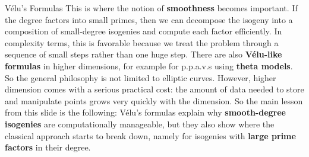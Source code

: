 \documentclass[aspectratio=169,notheorems]{beamer}
\begin{document}
\begin{frame}{Vélu's Formulas}
{			This is where the notion of \textbf{smoothness} becomes important. If the degree factors into small primes, then we can decompose the isogeny into a composition of small-degree isogenies and compute each factor efficiently. In complexity terms, this is favorable because we treat the problem through a sequence of small steps rather than one huge step.
			There are also \textbf{Vélu-like formulas} in higher dimensions, for example for p.p.a.v.s using \textbf{theta models}. So the general philosophy is not limited to elliptic curves. However, higher dimension comes with a serious practical cost: the amount of data needed to store and manipulate points grows very quickly with the dimension.
			So the main lesson from this slide is the following: Vélu's formulas explain why \textbf{smooth-degree isogenies} are computationally manageable, but they also show where the classical approach starts to break down, namely for isogenies with \textbf{large prime factors} in their degree.
		}
	\end{frame}
	
\end{document}
